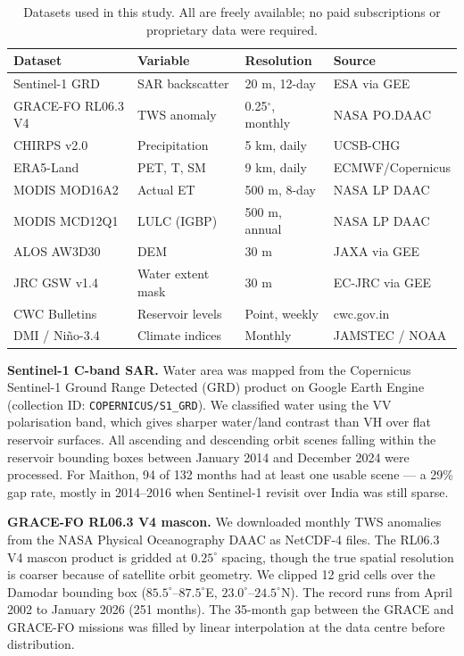 \documentclass[12pt,a4paper,oneside]{report}
\begin{document}
\begin{table}[htbp]
  \centering
  \caption{Datasets used in this study. All are freely available; no paid
  subscriptions or proprietary data were required.}
  \label{tab:thesis_data}
  \begin{tabularx}{\linewidth}{lXXX}
    \toprule
    Dataset & Variable & Resolution & Source \\
    \midrule
    Sentinel-1 GRD & SAR backscatter & 20 m, 12-day & ESA via GEE \\
    GRACE-FO RL06.3 V4 & TWS anomaly & 0.25$^\circ$, monthly & NASA PO.DAAC \\
    CHIRPS v2.0 & Precipitation & 5 km, daily & UCSB-CHG \\
    ERA5-Land & PET, T, SM & 9 km, daily & ECMWF/Copernicus \\
    MODIS MOD16A2 & Actual ET & 500 m, 8-day & NASA LP DAAC \\
    MODIS MCD12Q1 & LULC (IGBP) & 500 m, annual & NASA LP DAAC \\
    ALOS AW3D30 & DEM & 30 m & JAXA via GEE \\
    JRC GSW v1.4 & Water extent mask & 30 m & EC-JRC via GEE \\
    CWC Bulletins & Reservoir levels & Point, weekly & cwc.gov.in \\
    DMI / Ni\~{n}o-3.4 & Climate indices & Monthly & JAMSTEC / NOAA \\
    \bottomrule
  \end{tabularx}
\end{table}

\textbf{Sentinel-1 C-band SAR.} Water area was mapped from the Copernicus
Sentinel-1 Ground Range Detected (GRD) product on Google Earth Engine
(collection ID: \texttt{COPERNICUS/S1\_GRD}). We classified water using the
VV polarisation band, which gives sharper water/land contrast than VH over
flat reservoir surfaces. All ascending and descending orbit scenes falling
within the reservoir bounding boxes between January 2014 and December 2024
were processed. For Maithon, 94 of 132 months had at least one usable
scene --- a 29\% gap rate, mostly in 2014--2016 when Sentinel-1 revisit
over India was still sparse.

\textbf{GRACE-FO RL06.3 V4 mascon.} We downloaded monthly TWS anomalies
from the NASA Physical Oceanography DAAC as NetCDF-4 files. The RL06.3 V4
mascon product is gridded at $0.25^\circ$ spacing, though the true spatial
resolution is coarser because of satellite orbit geometry. We clipped 12
grid cells over the Damodar bounding box
($85.5^\circ$--$87.5^\circ$E, $23.0^\circ$--$24.5^\circ$N). The record
runs from April 2002 to January 2026 (251 months). The 35-month gap
between the GRACE and GRACE-FO missions was filled by linear interpolation
at the data centre before distribution.
\end{document}
